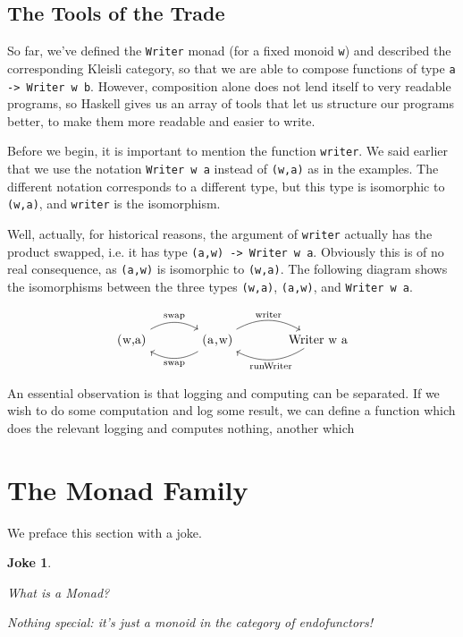 \documentclass[11pt]{article}
\newtheorem{joke}{Joke}
\theoremstyle{nonumberplain}
\newcommand*\lsin{\lstinline}
\newcommand*\lsmath[1]{\text{\lstinline|#1|}}
\begin{document}
\subsection{The Tools of the Trade}

So far, we've defined the \lsin|Writer| monad (for a fixed monoid \lsin|w|) and described the corresponding Kleisli category, so that we are able to compose functions of type \lsin|a -> Writer w b|. However, composition alone does not lend itself to very readable programs, so Haskell gives us an array of tools that let us structure our programs better, to make them more readable and easier to write.

Before we begin, it is important to mention the function \lsin|writer|. We said earlier that we use the notation \lsin|Writer w a| instead of \lsin|(w,a)| as in the examples. The different notation corresponds to a different type, but this type is isomorphic to \lsin|(w,a)|, and \lsin|writer| is the isomorphism.

Well, actually, for historical reasons, the argument of \lsin|writer| actually has the product swapped, i.e. it has type \lsin|(a,w) -> Writer w a|. Obviously this is of no real consequence, as \lsin|(a,w)| is isomorphic to \lsin|(w,a)|. The following diagram shows the isomorphisms between the three types \lsin|(w,a)|, \lsin|(a,w)|, and \lsin|Writer w a|.

\begin{equation}
\begin{tikzcd}[column sep = large]
\lsmath{(w,a)} \arrow[r, bend left, "\lsmath{swap}"] & \arrow[l, bend left, "\lsmath{swap}"] \lsmath{(a,w)} \arrow[r, bend left, "\lsmath{writer}"] & \lsmath{Writer w a} \arrow[l, bend left, "\lsmath{runWriter}"]
\end{tikzcd}
\end{equation}

An essential observation is that logging and computing can be separated. If we wish to do some computation and log some result, we can define a function which does the relevant logging and computes nothing, another which 

\section{The Monad Family}\label{sec:monads}

We preface this section with a joke.

\begin{joke}
\leavevmode
\begin{description}[labelindent=\parindent]
\item[Novice learning Haskell:] What is a Monad?

\item[Haskell expert:] Nothing special: it's just a monoid in the category of endofunctors!
\end{description}
\end{joke}
\end{document}
